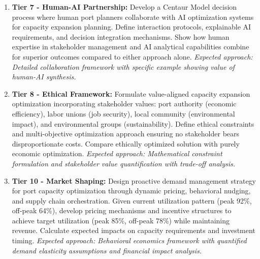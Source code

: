 \documentclass{article}
\begin{document}
\begin{enumerate}
\item \textbf{Tier 7 - Human-AI Partnership:} Develop a Centaur Model decision process where human port planners collaborate with AI optimization systems for capacity expansion planning. Define interaction protocols, explainable AI requirements, and decision integration mechanisms. Show how human expertise in stakeholder management and AI analytical capabilities combine for superior outcomes compared to either approach alone. \textit{Expected approach: Detailed collaboration framework with specific example showing value of human-AI synthesis.}

\item \textbf{Tier 8 - Ethical Framework:} Formulate value-aligned capacity expansion optimization incorporating stakeholder values: port authority (economic efficiency), labor unions (job security), local community (environmental impact), and environmental groups (sustainability). Define ethical constraints and multi-objective optimization approach ensuring no stakeholder bears disproportionate costs. Compare ethically optimized solution with purely economic optimization. \textit{Expected approach: Mathematical constraint formulation and stakeholder value quantification with trade-off analysis.}

\item \textbf{Tier 10 - Market Shaping:} Design proactive demand management strategy for port capacity optimization through dynamic pricing, behavioral nudging, and supply chain orchestration. Given current utilization pattern (peak 92\%, off-peak 64\%), develop pricing mechanisms and incentive structures to achieve target utilization (peak 85\%, off-peak 78\%) while maintaining revenue. Calculate expected impacts on capacity requirements and investment timing. \textit{Expected approach: Behavioral economics framework with quantified demand elasticity assumptions and financial impact analysis.}
\end{enumerate}
\end{document}
